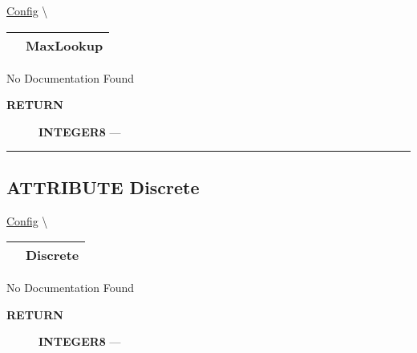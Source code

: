 \hypertarget{ecldoc:ml_core.config.maxlookup}{}
\hspace{0pt} \hyperlink{ecldoc:ML_Core.Config}{Config} \textbackslash 

{\renewcommand{\arraystretch}{1.5}
\begin{tabularx}{\textwidth}{|>{\raggedright\arraybackslash}l|X|}
\hline
\hspace{0pt}\mytexttt{\color{red} } & \textbf{MaxLookup} \\
\hline
\end{tabularx}
}

\par





No Documentation Found








\par
\begin{description}
\item [\colorbox{tagtype}{\color{white} \textbf{\textsf{RETURN}}}] \textbf{INTEGER8} --- 
\end{description}




\rule{\linewidth}{0.5pt}
\subsection*{\textsf{\colorbox{headtoc}{\color{white} ATTRIBUTE}
Discrete}}

\hypertarget{ecldoc:ml_core.config.discrete}{}
\hspace{0pt} \hyperlink{ecldoc:ML_Core.Config}{Config} \textbackslash 

{\renewcommand{\arraystretch}{1.5}
\begin{tabularx}{\textwidth}{|>{\raggedright\arraybackslash}l|X|}
\hline
\hspace{0pt}\mytexttt{\color{red} } & \textbf{Discrete} \\
\hline
\end{tabularx}
}

\par





No Documentation Found








\par
\begin{description}
\item [\colorbox{tagtype}{\color{white} \textbf{\textsf{RETURN}}}] \textbf{INTEGER8} --- 
\end{description}




